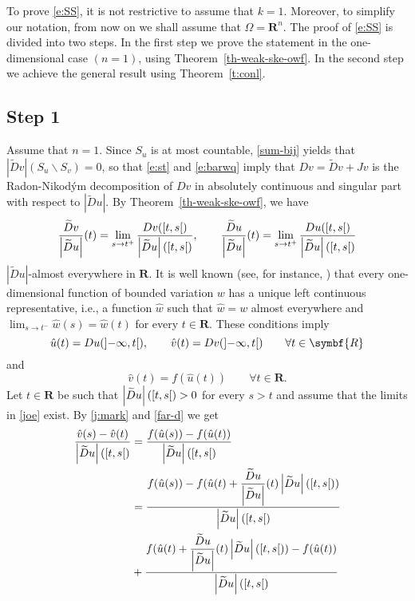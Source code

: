 \documentclass{article}
\theoremstyle{definition}
\theoremstyle{remark}
\newcommand{\thmref}[1]{Theorem~\ref{#1}}
\newcommand{\wt}{\widetilde}
\newcommand{\interval}[1]{\mathinner{#1}}
\newcommand{\envert}[1]{\left\lvert#1\right\rvert}
\let\abs=\envert
\begin{document}
To prove \eqref{e:SS}, it is not restrictive to assume that $k=1$.
Moreover, to simplify our notation, from now on we shall assume that
$\Omega = \symbf{R}^n$. The proof of \eqref{e:SS} is divided into two
steps. In the first step we prove the statement in the one-dimensional
case $(n=1)$, using \thmref{th-weak-ske-owf}. In the second step we
achieve the general result using \thmref{t:conl}.

\subsection*{Step 1}
Assume that $n=1$. Since $S_u$ is at most countable, \eqref{sum-bij}
yields that $\abs{\wt{D}v}(S_u\backslash S_v)=0$, so that
\eqref{e:st} and \eqref{e:barwq} imply that $Dv=\wt{D}v+Jv$ is
the Radon-Nikod\'ym decomposition of $Dv$ in absolutely continuous and
singular part with respect to $\abs{\wt{D} u}$. By
\thmref{th-weak-ske-owf}, we have
\begin{equation*}
\frac{\wt{D}v}{\abs{\wt{D}u}}(t)=\lim_{s\to t^+}
\frac{Dv(\interval{\left[t,s\right[})}
{\abs{\wt{D}u}(\interval{\left[t,s\right[})},\qquad
\frac{\wt{D}u}{\abs{\wt{D}u}}(t)=\lim_{s\to t^+}
\frac{Du(\interval{\left[t,s\right[})}
{\abs{\wt{D}u}(\interval{\left[t,s\right[})}
\end{equation*}
$\abs{\wt{D}u}$-almost everywhere in $\symbf{R}$. It is well known
(see, for instance, \cite[2.5.16]{ste:sint}) that every one-dimensional
function of bounded variation $w$ has a unique left continuous
representative, i.e., a function $\hat w$ such that $\hat w=w$ almost
everywhere and $\lim_{s\to t^-}\hat w(s)=\hat w(t)$ for every $t\in
\symbf{R}$. These conditions imply
\begin{equation}
\hat u(t)=Du(\interval{\left]-\infty,t\right[}),
\qquad \hat v(t)=Dv(\interval{\left]-\infty,t\right[})\qquad
\forall t\in\symbf{R}
\end{equation}
and
\begin{equation}\label{alimo}
\hat v(t)=f(\hat u(t))\qquad\forall t\in\symbf{R}.\end{equation}
Let $t\in\symbf{R}$ be such that
$\abs{\wt{D}u}(\interval{\left[t,s\right[})>0$ for every $s>t$ and
assume that the limits in \eqref{joe} exist. By \eqref{j:mark} and
\eqref{far-d} we get
\begin{equation*}\begin{split}
\frac{\hat v(s)-\hat
v(t)}{\abs{\wt{D}u}(\interval{\left[t,s\right[})}&=\frac {f(\hat
u(s))-f(\hat u(t))}{\abs{\wt{D}u}(\interval{\left[t,s\right[})}\\
&=\frac{f(\hat u(s))-f(\hat
u(t)+\dfrac{\wt{D}u}{\abs{\wt{D}u}}(t)\abs{\wt{D}u
}(\interval{\left[t,s\right[}))}%
{\abs{\wt{D}u}(\interval{\left[t,s\right[})}\\
&+\frac
{f(\hat u(t)+\dfrac{\wt{D}u}{\abs{\wt{D}u}}(t)\abs{\wt{D}
u}(\interval{\left[t,s\right[}))-f(\hat
u(t))}{\abs{\wt{D}u}(\interval{\left[t,s\right[})}
\end{split}\end{equation*}
\end{document}
